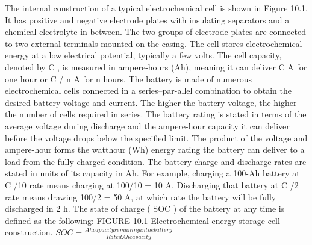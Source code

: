 The internal construction of a typical electrochemical cell is shown in Figure 10.1. It has positive and negative electrode plates with insulating separators and a chemical electrolyte in between. The two groups of electrode plates are connected to two external terminals mounted on the casing. The cell stores electrochemical energy at a low electrical potential, typically a few volts. The cell capacity, denoted by C , is measured in ampere-hours (Ah), meaning it can deliver C A for one hour or C / n A for n hours.
The battery is made of numerous electrochemical cells connected in a series–par-allel combination to obtain the desired battery voltage and current. The higher the battery voltage, the higher the number of cells required in series. The battery rating is stated in terms of the average voltage during discharge and the ampere-hour capacity it can deliver before the voltage drops below the specified limit. The product of the voltage and ampere-hour forms the watthour (Wh) energy rating the battery
can deliver to a load from the fully charged condition. The battery charge and discharge rates are stated in units of its capacity in Ah. For example, charging a 100-Ah battery at C
/10 rate means charging at 100/10 = 10 A. Discharging that
battery at C /2 rate means drawing 100/2 = 50 A, at which rate the battery will be fully discharged in 2 h. The state of charge ( SOC ) of the battery at any time is defined as the following:
FIGURE 10.1
Electrochemical energy storage cell construction.
$SOC = \frac{Ah capacity remaning in the battery}
{Rated Ah capacity}$





\newpage




\newpage

